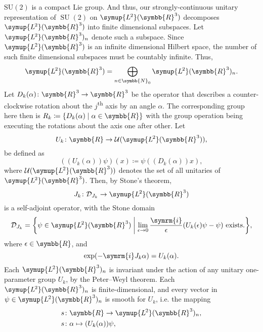 \documentclass[12pt, a4 paper]{article}
\let\symcal\mathcal
\theoremstyle{definition}
\newcommand{\ltwo}{\symup{L\kern-0.5pt^2}}
\newcommand{\ltworthree}{\ltwo(\rr^3)}
\newcommand{\rthree}{\symbb{R}^3}
\newcommand{\rr}{\symbb{R}}
\newcommand{\nn}{\symbb{N}_0}
\newcommand{\schwartz}{\symcal{S}}
\newcommand{\schwartzrthree}{\schwartz(\rr^3)}
\renewcommand{\i}{\symrm{i}}
\newcommand{\domain}{\symcal{D}}
\newcommand{\spec}{\sigma}
\newcommand{\SUtwo}{\operatorname{SU}(2)}
\newcommand\restr[2]{{%
        \left.\kern-\nulldelimiterspace %
        #1 %
        \littletaller %
        \right|_{#2} %
    }}
\newcommand{\littletaller}{\mathchoice{\vphantom{\big|}}{}{}{}}
\begin{document}
    \(\operatorname{SU(2)}\) is a compact Lie group. And thus, our strongly-continuous unitary representation of \(\SUtwo\) on \(\ltworthree\) decomposes \(\ltworthree\) into finite dimensional subspaces. Let \(\ltworthree_n\) denote such a subspace. Since \(\ltworthree\) is an infinite dimensional Hilbert space, the number of such finite dimensional subspaces must be countably infinite. Thus,
    \[
        \ltworthree = \bigoplus_{n \in \nn} \ltworthree_n.
    \]
    Let \(D_k(\alpha) \colon \rthree \rightarrow \rthree\) be the operator that describes a counter-clockwise rotation about the \(j\)\textsuperscript{th} axis by an angle \(\alpha\). The corresponding group here then is \(R_k \coloneq \{D_k(\alpha) \mid \alpha \in \rr\}\) with the group operation being executing the rotations about the axis one after other. Let
    \[
        U_k \colon \rr \rightarrow \symcal{U}(\ltworthree),
    \]
    be defined as
    \[
        ((U_k(\alpha))\psi)(x) \coloneq \psi((D_k(\alpha))x), 
    \]
    where \(\symcal{U}(\ltworthree)\) denotes the set of all unitaries of \(\ltworthree\). Then, by Stone's theorem,
    \[
        J_k \colon \domain_{J_k} \rightarrow \ltworthree
    \] is a self-adjoint operator, with the Stone domain
    \[
        \domain_{J_k} = \bigg\{ \psi \in \ltworthree \biggm| \lim_{\epsilon \rightarrow 0} \frac{\i}{\epsilon} (U_k(\epsilon)\psi - \psi) \text{ exists.}\bigg\},
    \]
    where \(\epsilon \in \rr\), and
    \[
        \exp(-\i J_k \alpha) = U_k(\alpha).
    \]
    Each \(\ltworthree_n\) is invariant under the action of any unitary one-parameter group \(U_k\), by the Peter--Weyl theorem. Each \(\ltworthree_n\) is finite-dimensional, and every vector in \(\psi \in \ltworthree_n\) is smooth for \(U_k\), i.e. the mapping
    \begin{align*}
        s &\colon \rr \rightarrow \ltworthree_n,\\
        s &\colon \alpha \mapsto (U_k(\alpha))\psi,
    \end{align*}
\end{document}
